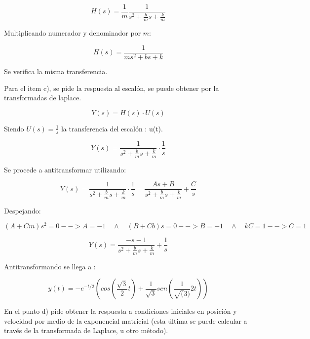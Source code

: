 \documentclass[a4paper]{article}
\begin{document}
\begin{equation}
	H(s)=
	\frac{1}{m}
	\frac{1}{s^2+\frac{b}{m}s+\frac{k}{m}}
\end{equation}

Multiplicando numerador y denominador por \(m\):

\begin{equation}
	H(s)=\frac{1}{ms^2+bs+k}
\end{equation}

Se verifica la misma transferencia.

Para el item c), se pide la respuesta al escalón, se puede obtener por la transformadas de laplace.

\begin{equation}
	Y(s) = H(s) \cdot U(s)
\end{equation}

Siendo $U(s) = \frac{1}{s} $ la transferencia del escalón : u(t).


\begin{equation}
	Y(s) = \frac{1}{s^2+\frac{b}{m}s+\frac{k}{m}} \cdot\frac{1}{s}
\end{equation}


Se procede a antitransformar utilizando:

\begin{equation}
	Y(s) = \frac{1}{s^2+\frac{b}{m}s+\frac{k}{m}} \cdot\frac{1}{s} = \frac{As + B}{s^2+\frac{b}{m}s+\frac{k}{m}} + \frac{C}{s}
\end{equation}

Despejando:

\begin{equation}
	(A+ Cm ) s^2 = 0 --> A =-1 \quad \wedge \quad (B + Cb )s = 0 --> B = -1 \quad \wedge \quad kC = 1 --> C = 1 
\end{equation}


\begin{equation}
	Y(s) =  \frac{-s -1 }{s^2+\frac{b}{m}s+\frac{k}{m}} + \frac{1}{s}
\end{equation}



Antitransformando se llega a :

\begin{equation}
	y(t) = - e^{-t/2} \left(cos\left(\frac{\sqrt{3}}{2} t \right) + \frac{1}{\sqrt{3}}  sen\left(\frac{1}{\sqrt(3) }{2} t \right) \right)
\end{equation}


En el punto d) pide obtener la respuesta a condiciones iniciales en posición y velocidad por medio de la exponencial
matricial (esta última se puede calcular a través de la transformada de Laplace, u otro método).
\end{document}

